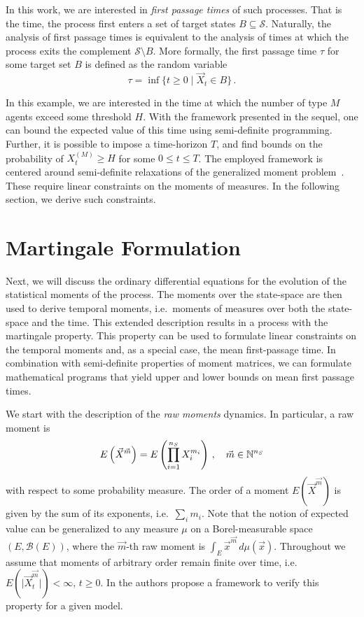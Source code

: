 In this work, we are interested in \emph{first passage times} of such processes.
That is the time, the process first enters a set of target states
$B\subseteq \mathcal{S}$. Naturally, the analysis of first passage times is
equivalent
to the analysis of times at which the process exits the complement $\mathcal{S}\setminus B$.
More formally, the first passage time $\tau$ for
some target set $B$ is defined as the random variable
\begin{equation}\label{eq:fpt_def}
    \tau = \inf\{t\geq 0\mid \vec X_t \in B\}\,.
\end{equation}


In this example, we are interested in the time at which the number of type $M$ agents
exceed some threshold $H$.
With the framework presented in the sequel, one can bound the expected value
of this time using semi-definite programming.
Further, it is possible to impose a time-horizon $T$, and find bounds
on the probability of $ X_t^{(M)}\geq H$ for some $0\leq t\leq T$.
The employed framework is centered around semi-definite relaxations
of the generalized moment problem~\cite{lasserre2010moments}.
These require linear constraints on the moments of measures.
In the following section, we derive such constraints.

\section{Martingale Formulation}\label{sec:mfpt:moments}
Next, we will discuss the ordinary differential equations for the evolution of the statistical moments of
the process.
The moments over the state-space are then used to derive temporal moments, i.e.\ moments
of measures over both the state-space and the time.
This extended description results in a process with the martingale property.
This property can be used to formulate linear constraints on the temporal moments
and, as a special case, the mean first-passage time.
In combination with semi-definite properties of moment matrices, we can formulate
mathematical programs that yield upper and lower bounds on mean first passage times.

We start with the description of the \emph{raw moments} dynamics.
In particular, a raw moment is
$${E}\left(\vec X^{\vec m}\right)={E}\left(\prod_{i=1}^{n_S} X_i^{m_i}\right)\,,\quad \vec m\in {\mathbb{N}}^{n_S}$$
with respect to some probability measure.
The order of a moment $E({\vec X}^{\vec m})$ is given by the sum of its exponents,
i.e.\ $\sum_i m_i$.
Note that the notion of  expected value can be generalized
to any measure $\mu$ on a Borel-measurable space
$(E, \mathcal{B}(E))$, where
 the $\vec{m}$-th raw moment is $\int_E {\vec x}^{\vec m}\,d\mu(\vec x)$.
Throughout we assume that moments of arbitrary order remain finite over time,
i.e.\ $E(\lvert \vec{X}^{\vec{m}}_t\rvert)<\infty$, $t\geq 0$.
In \citet{gupta2014scalable} the authors propose a framework to verify
this property for a given model.

